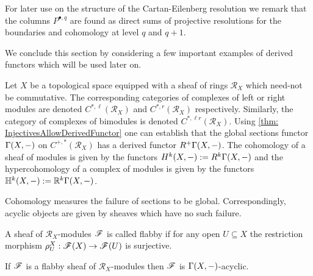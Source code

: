 For later use on the structure of the Cartan-Eilenberg resolution we remark that the columns $P^{\bullet,q}$ are found as direct sums of projective resolutions for the boundaries and cohomology at level $q$ and $q+1$.

We conclude this section by considering a few important examples of derived functors which will be used later on.

Let $X$ be a topological space equipped with a sheaf of rings $\mathcal{R}_X$ which need-not be commutative.
The corresponding categories of complexes of left or right modules are denoted $C^{*,\ell}(\mathcal{R}_X)$ and $C^{*,r}(\mathcal{R}_X)$ respectively.
Similarly, the category of complexes of bimodules is denoted $C^{*,\ell r}(\mathcal{R}_X)$.
Using \cref{thm: InjectivesAllowDerivedFunctor} one can establish that the global sections functor $\Gamma(X,{-})$ on $C^{+,*}(\mathcal{R}_X)$ has a derived functor $R^+\Gamma(X,{-})$.
The cohomology of a sheaf of modules is given by the functors $H^k(X,{-}) := R^k \Gamma(X,{-})$ and the hypercohomology of a complex of modules is given by the functors $\mathbb{H}^k(X,{-}):= \mathbb{R}^k\Gamma(X,{-})$.

Cohomology measures the failure of sections to be global.
Correspondingly, acyclic objects are given by sheaves which have no such failure.
\begin{definition}
 A sheaf of $\mathcal{R}_X$-modules $\mathscr{F}$ is called flabby if for any open $U\subseteq X$ the restriction morphism $\rho_U^X:\mathscr{F}(X)\to\mathscr{F}(U) $ is surjective.
\end{definition}
\begin{proposition}{\cite[Proposition 2.1.8.]{dimca2004sheaves}}
 If $\mathscr{F}$ is a flabby sheaf of $\mathcal{R}_X$-modules then $\mathscr{F}$ is $\Gamma(X,{-})$-acyclic.
\end{proposition}


